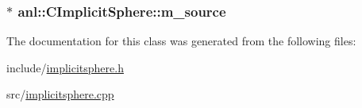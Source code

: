 \label{classanl_1_1CImplicitSphere_a63eb786dc3193af282d77701a44b6d0e}
\hypertarget{classanl_1_1CImplicitSphere_a4ae09ba6643e92663518b46481798739}{
\subsubsection[{m\_\-source}]{$\ast$ {\bf anl::CImplicitSphere::m\_\-source}}}
\label{classanl_1_1CImplicitSphere_a4ae09ba6643e92663518b46481798739}


The documentation for this class was generated from the following files:\begin{DoxyCompactItemize}
\item 
include/\hyperlink{implicitsphere_8h}{implicitsphere.h}\item 
src/\hyperlink{implicitsphere_8cpp}{implicitsphere.cpp}\end{DoxyCompactItemize}
